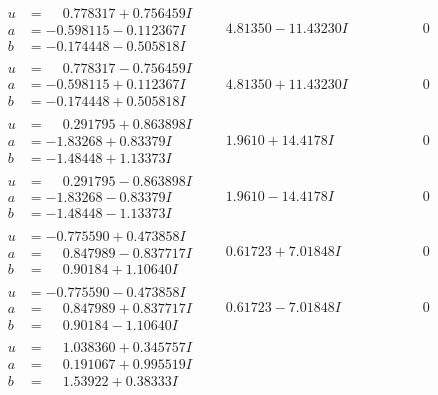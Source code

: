 \documentclass[1p]{elsarticle_modified}
\theoremstyle{definition}
\begin{document}
$$\begin{array}{c|c|c}
\begin{aligned}
u &= \phantom{-}0.778317 + 0.756459 I \\
a &= -0.598115 - 0.112367 I \\
b &= -0.174448 - 0.505818 I\end{aligned}
 & \phantom{-}4.81350 - 11.43230 I & \phantom{-0.000000 } 0 \\ \hline\begin{aligned}
u &= \phantom{-}0.778317 - 0.756459 I \\
a &= -0.598115 + 0.112367 I \\
b &= -0.174448 + 0.505818 I\end{aligned}
 & \phantom{-}4.81350 + 11.43230 I & \phantom{-0.000000 } 0 \\ \hline\begin{aligned}
u &= \phantom{-}0.291795 + 0.863898 I \\
a &= -1.83268 + 0.83379 I \\
b &= -1.48448 + 1.13373 I\end{aligned}
 & \phantom{-}1.9610 + 14.4178 I & \phantom{-0.000000 } 0 \\ \hline\begin{aligned}
u &= \phantom{-}0.291795 - 0.863898 I \\
a &= -1.83268 - 0.83379 I \\
b &= -1.48448 - 1.13373 I\end{aligned}
 & \phantom{-}1.9610 - 14.4178 I & \phantom{-0.000000 } 0 \\ \hline\begin{aligned}
u &= -0.775590 + 0.473858 I \\
a &= \phantom{-}0.847989 - 0.837717 I \\
b &= \phantom{-}0.90184 + 1.10640 I\end{aligned}
 & \phantom{-}0.61723 + 7.01848 I & \phantom{-0.000000 } 0 \\ \hline\begin{aligned}
u &= -0.775590 - 0.473858 I \\
a &= \phantom{-}0.847989 + 0.837717 I \\
b &= \phantom{-}0.90184 - 1.10640 I\end{aligned}
 & \phantom{-}0.61723 - 7.01848 I & \phantom{-0.000000 } 0 \\ \hline\begin{aligned}
u &= \phantom{-}1.038360 + 0.345757 I \\
a &= \phantom{-}0.191067 + 0.995519 I \\
b &= \phantom{-}1.53922 + 0.38333 I\end{aligned}

\end{array}$$
\end{document}
